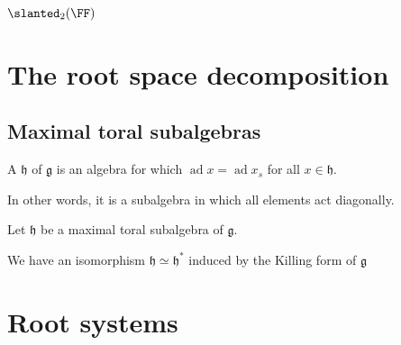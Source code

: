 \documentclass{article}
\DeclareMathOperator{\ad}{ad}
\newcommand*\frkg{{\ensuremath{\mathfrak{g}}}}
\newcommand*\frkh{{\ensuremath{\mathfrak{h}}}}
\let\sl\slanted
\newcommand*\sl{\ensuremath{\mathfrak{sl}}}
\begin{document}
\section{\texorpdfstring{$\sl_2(\FF)$}{sl2(F)}}

\section{The root space decomposition}

\subsection{Maximal toral subalgebras}

\begin{definition}
    A  $\frkh$ of $\frkg$ is an algebra for which $\ad x = \ad x_s$ for all $x \in \frkh$.
\end{definition}

In other words, it is a subalgebra in which all elements act diagonally.

\begin{proposition}
    Let $\frkh$ be a maximal toral subalgebra of $\frkg$.

    We have an isomorphism $\frkh \simeq \frkh^\ast$ induced by the Killing form of $\frkg$
\end{proposition}

\section{Root systems}

\begin{definition}
\end{definition}
\end{document}
